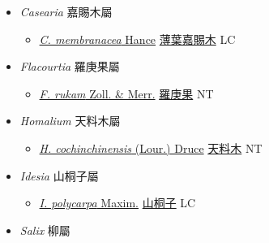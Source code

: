 
  \begin{itemize}
 \item[] \textit{Casearia} 嘉賜木屬
                    
  \begin{itemize}
        \item[] \href{http://www.theplantlist.org/tpl1.1/search?q=Casearia+membranacea}{\textit{C. membranacea} Hance}   \href{\detokenize{http://taibnet.sinica.edu.tw/chi/taibnet_species_list.php?T2=薄葉嘉賜木&T2_new_value=true&fr=y}}{薄葉嘉賜木} LC
  \end{itemize}
 \item[] \textit{Flacourtia} 羅庚果屬
                    
  \begin{itemize}
        \item[] \href{http://www.theplantlist.org/tpl1.1/search?q=Flacourtia+rukam}{\textit{F. rukam} Zoll. \& Merr.}   \href{\detokenize{http://taibnet.sinica.edu.tw/chi/taibnet_species_list.php?T2=羅庚果&T2_new_value=true&fr=y}}{羅庚果} NT
  \end{itemize}
 \item[] \textit{Homalium} 天料木屬
                    
  \begin{itemize}
        \item[] \href{http://www.theplantlist.org/tpl1.1/search?q=Homalium+cochinchinensis}{\textit{H. cochinchinensis} (Lour.) Druce}   \href{\detokenize{http://taibnet.sinica.edu.tw/chi/taibnet_species_list.php?T2=天料木&T2_new_value=true&fr=y}}{天料木} NT
  \end{itemize}
 \item[] \textit{Idesia} 山桐子屬
                    
  \begin{itemize}
        \item[] \href{http://www.theplantlist.org/tpl1.1/search?q=Idesia+polycarpa}{\textit{I. polycarpa} Maxim.}   \href{\detokenize{http://taibnet.sinica.edu.tw/chi/taibnet_species_list.php?T2=山桐子&T2_new_value=true&fr=y}}{山桐子} LC
  \end{itemize}
 \item[] \textit{Salix} 柳屬
                    

\end{itemize}
